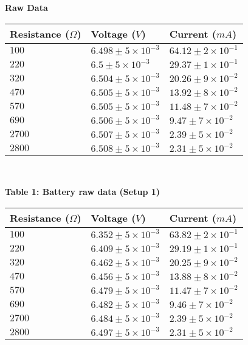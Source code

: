 \newpage
{{\large\textbf{Raw Data}}} \\

\begin{tabular}{| p{} | p{} | p{} |}
    \hline
    Resistance ($\Omega$) & Voltage ($V$) & Current ($mA$)\\
    \hline 
    $100$ & $6.498 \pm 5\times10^{-3}$ & $64.12 \pm 2\times10^{-1}$\\
    $220$ & $6.5 \pm 5\times10^{-3}$ & $29.37 \pm 1\times10^{-1}$\\
    $320$ & $6.504 \pm 5\times10^{-3}$ & $20.26 \pm 9\times10^{-2}$\\
    $470$ & $6.505 \pm 5\times10^{-3}$ & $13.92 \pm 8\times10^{-2}$\\
    $570$ & $6.505 \pm 5\times10^{-3}$ & $11.48 \pm 7\times10^{-2}$\\
    $690$ & $6.506 \pm 5\times10^{-3}$ & $9.47 \pm 7\times10^{-2}$\\
    $2700$ & $6.507 \pm 5\times10^{-3}$ & $2.39 \pm 5\times10^{-2}$\\
    $2800$ & $6.508 \pm 5\times10^{-3}$ & $2.31 \pm 5\times10^{-2}$\\
    \hline 
 \end{tabular}\\

\begin{center}
    {\textbf{Table 1: Battery raw data (Setup 1)} }
\end{center}
\vspace{10pt}
\begin{tabular}{| p{} | p{} | p{} |}
    \hline
    Resistance ($\Omega$) & Voltage ($V$) & Current ($mA$)\\
    \hline 
    $100$ & $6.352 \pm 5\times10^{-3}$ & $63.82 \pm 2\times10^{-1}$\\
    $220$ & $6.409 \pm 5\times10^{-3}$ & $29.19 \pm 1\times10^{-1}$\\
    $320$ & $6.462 \pm 5\times10^{-3}$ & $20.25 \pm 9\times10^{-2}$\\
    $470$ & $6.456 \pm 5\times10^{-3}$ & $13.88 \pm 8\times10^{-2}$\\
    $570$ & $6.479 \pm 5\times10^{-3}$ & $11.47 \pm 7\times10^{-2}$\\
    $690$ & $6.482 \pm 5\times10^{-3}$ & $9.46 \pm 7\times10^{-2}$\\
    $2700$ & $6.484 \pm 5\times10^{-3}$ & $2.39 \pm 5\times10^{-2}$\\
    $2800$ & $6.497 \pm 5\times10^{-3}$ & $2.31 \pm 5\times10^{-2}$\\
    \hline 
 \end{tabular}\\

